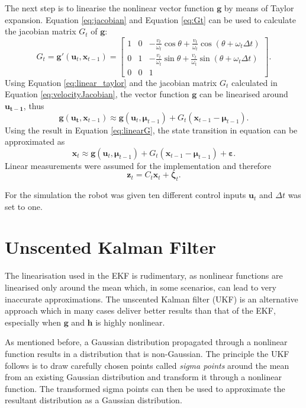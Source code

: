 \documentclass[12pt,oneside,openany,a4paper, %
afrikaans,english,
]{memoir}
\numberwithin{equation}{chapter}
\begin{document}
The next step is to linearise the nonlinear vector function $\bm{g}$ by means of Taylor expansion. Equation \ref{eq:jacobian} and Equation \ref{eq:Gt} can be used to calculate the jacobian matrix $G_t$ of $\bm{g}$:
\begin{equation}\label{eq:velocityJacobian}
G_t = \bm{g}'(\bm{u}_t, \bm{x}_{t-1}) =
\begin{bmatrix}
1 & 0 & -\frac{v_t}{\omega_t} \cos\theta + \frac{v_t}{\omega_t} \cos(\theta + \omega_t \Delta t)\\
0 & 1 & -\frac{v_t}{\omega_t}\sin\theta + \frac{v_t}{\omega_t}\sin(\theta + \omega_t \Delta t)\\
0 & 0 & 1 
\end{bmatrix}.
\end{equation}
Using Equation \ref{eq:linear_taylor} and the jacobian matrix $G_t$ calculated in Equation \ref{eq:velocityJacobian}, the vector function $\bm{g}$ can be linearised around $\bm{u_{t-1}}$, thus
\begin{equation}\label{eq:linearG}
\bm{g}(\bm{u_t}, \bm{x}_{t-1}) \approx \bm{g}(\bm{u}_t, \bm{\mu}_{t-1}) + G_t(\bm{x}_{t-1} - 
\bm{\mu}_{t-1}).
\end{equation} 
Using the result in Equation \ref{eq:linearG}, the state transition in equation can be approximated as
\begin{equation}
\bm{x}_t \approx \bm{g}(\bm{u}_t, \bm{\mu}_{t-1}) + G_t(\bm{x}_{t-1} - \bm{\mu}_{t-1}) + \bm{\varepsilon}.
\end{equation} 
Linear measurements were assumed for the implementation and therefore
\begin{equation}
\bm{z}_t = C_t \bm{x}_t + \bm{\zeta}_t.
\end{equation}

For the simulation the robot was given ten different control inputs $\bm{u}_t$ and $\Delta t$ was set to one.
\section{Unscented Kalman Filter}\label{sec:UKF}
The linearisation used in the EKF is rudimentary, as nonlinear functions are linearised only around the mean which, in some scenarios, can lead to very inaccurate approximations. The unscented Kalman filter (UKF) is an alternative approach which in many cases deliver better results than that of the EKF, especially when $\bm{g}$ and $\bm{h}$ is highly nonlinear.

As mentioned before, a Gaussian distribution propagated through a nonlinear function results in a distribution that is non-Gaussian. The principle the UKF follows is to draw carefully chosen points called \textit{sigma points} around the mean from an existing Gaussian distribution and transform it through a nonlinear function. The transformed sigma points can then be used to approximate the resultant distribution as a Gaussian distribution.
\end{document}
